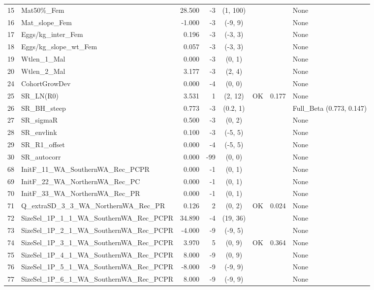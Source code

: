\documentclass[12pt,]{article}
\begin{document}
\begin{landscape}
\begin{longtable}{rlrrcccl}
  15 & Mat50\%\_Fem & 28.500 & -3 & (1, 100) &  &  & None \\ 
  16 & Mat\_slope\_Fem & -1.000 & -3 & (-9, 9) &  &  & None \\ 
  17 & Eggs/kg\_inter\_Fem & 0.196 & -3 & (-3, 3) &  &  & None \\ 
  18 & Eggs/kg\_slope\_wt\_Fem & 0.057 & -3 & (-3, 3) &  &  & None \\ 
  19 & Wtlen\_1\_Mal & 0.000 & -3 & (0, 1) &  &  & None \\ 
  20 & Wtlen\_2\_Mal & 3.177 & -3 & (2, 4) &  &  & None \\ 
  24 & CohortGrowDev & 0.000 & -4 & (0, 0) &  &  & None \\ 
  25 & SR\_LN(R0) & 3.531 & 1 & (2, 12) & OK & 0.177 & None \\ 
  26 & SR\_BH\_steep & 0.773 & -3 & (0.2, 1) &  &  & Full\_Beta (0.773, 0.147) \\ 
  27 & SR\_sigmaR & 0.500 & -3 & (0, 2) &  &  & None \\ 
  28 & SR\_envlink & 0.100 & -3 & (-5, 5) &  &  & None \\ 
  29 & SR\_R1\_offset & 0.000 & -4 & (-5, 5) &  &  & None \\ 
  30 & SR\_autocorr & 0.000 & -99 & (0, 0) &  &  & None \\ 
  68 & InitF\_11\_WA\_SouthernWA\_Rec\_PCPR & 0.000 & -1 & (0, 1) &  &  & None \\ 
  69 & InitF\_22\_WA\_NorthernWA\_Rec\_PC & 0.000 & -1 & (0, 1) &  &  & None \\ 
  70 & InitF\_33\_WA\_NorthernWA\_Rec\_PR & 0.000 & -1 & (0, 1) &  &  & None \\ 
  71 & Q\_extraSD\_3\_3\_WA\_NorthernWA\_Rec\_PR & 0.126 & 2 & (0, 2) & OK & 0.024 & None \\ 
  72 & SizeSel\_1P\_1\_1\_WA\_SouthernWA\_Rec\_PCPR & 34.890 & -4 & (19, 36) &  &  & None \\ 
  73 & SizeSel\_1P\_2\_1\_WA\_SouthernWA\_Rec\_PCPR & -4.000 & -9 & (-9, 5) &  &  & None \\ 
  74 & SizeSel\_1P\_3\_1\_WA\_SouthernWA\_Rec\_PCPR & 3.970 & 5 & (0, 9) & OK & 0.364 & None \\ 
  75 & SizeSel\_1P\_4\_1\_WA\_SouthernWA\_Rec\_PCPR & 8.000 & -9 & (0, 9) &  &  & None \\ 
  76 & SizeSel\_1P\_5\_1\_WA\_SouthernWA\_Rec\_PCPR & -8.000 & -9 & (-9, 9) &  &  & None \\ 
  77 & SizeSel\_1P\_6\_1\_WA\_SouthernWA\_Rec\_PCPR & 8.000 & -9 & (-9, 9) &  &  & None \\ 

\end{longtable}
\end{landscape}
\end{document}
